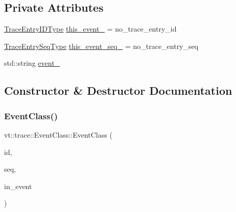 \subsection*{Private Attributes}
\begin{DoxyCompactItemize}
\item 
\hyperlink{namespacevt_1_1trace_a3c14050715ba9eceaeff51fb3de64f2f}{Trace\+Entry\+I\+D\+Type} \hyperlink{structvt_1_1trace_1_1_event_class_a250c7586347cbe0afcf918bc35460975}{this\+\_\+event\+\_\+} = no\+\_\+trace\+\_\+entry\+\_\+id
\item 
\hyperlink{namespacevt_1_1trace_a522028dd2a7d056f0ec3d417836fdecd}{Trace\+Entry\+Seq\+Type} \hyperlink{structvt_1_1trace_1_1_event_class_af2fc4301096c5d6573dc0651787f490b}{this\+\_\+event\+\_\+seq\+\_\+} = no\+\_\+trace\+\_\+entry\+\_\+seq
\item 
std\+::string \hyperlink{structvt_1_1trace_1_1_event_class_ac77bbacef54bf8288365673bd0d21523}{event\+\_\+}
\end{DoxyCompactItemize}


\subsection{Constructor \& Destructor Documentation}
\mbox{\label{structvt_1_1trace_1_1_event_class_ac9ec736933394fb09a42abf600d691a8}} 
\subsubsection{\texorpdfstring{Event\+Class()}{EventClass()}\hspace{0.1cm}{\footnotesize\ttfamily [1/3]}}
{\footnotesize\ttfamily vt\+::trace\+::\+Event\+Class\+::\+Event\+Class (\begin{DoxyParamCaption}\item[{\hyperlink{namespacevt_1_1trace_a3c14050715ba9eceaeff51fb3de64f2f}{Trace\+Entry\+I\+D\+Type}}]{id,  }\item[{\hyperlink{namespacevt_1_1trace_a522028dd2a7d056f0ec3d417836fdecd}{Trace\+Entry\+Seq\+Type}}]{seq,  }\item[{std\+::string const \&}]{in\+\_\+event }\end{DoxyParamCaption})}

\mbox{\label{structvt_1_1trace_1_1_event_class_a50a0237b8fa6d512720b3aa3830ae30a}} 
